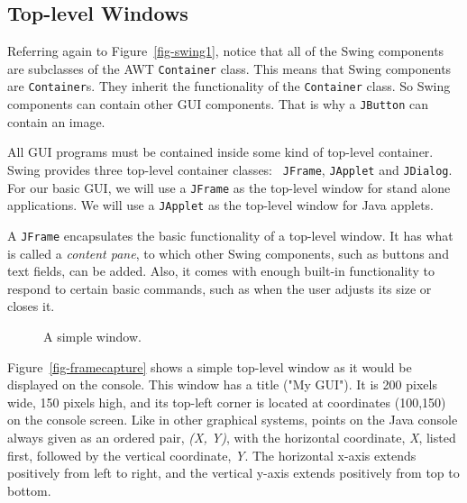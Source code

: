 \subsection{Top-level Windows}

Referring again to Figure~\ref{fig-swing1}, notice that all of the
Swing components are subclasses of the AWT {\tt Container} class.
This means that Swing components are {\tt Container}s. They inherit
the functionality of the {\tt Container} class. So Swing components
can contain other GUI components. That is why a {\tt JButton} can
contain an image.

All GUI programs must be contained inside some kind of top-level
container.  Swing provides three top-level container classes: {\tt
JFrame}, {\tt JApplet} and {\tt JDialog}.  For our basic GUI, we will
use a {\tt JFrame} as the top-level window for stand alone
applications.  We will use a {\tt JApplet} as the top-level window for
Java applets.

A {\tt JFrame} encapsulates the basic functionality of a top-level
window. It has what is called a {\em content pane}, to which
other Swing components, such as buttons and text fields, can be
added. Also, it comes with enough built-in functionality to respond to
certain basic commands, such as when the user adjusts its
size or closes it.

\begin{figure}[tb]
{A simple window.
\label{fig-framecapture}
\label{pg-fig-framecapture}}
\end{figure}

Figure~\ref{fig-framecapture} shows a simple top-level window as it
would be displayed on the console. This window has a title ("My
GUI"). It is 200 pixels wide, 150 pixels high, and its top-left corner
is located at coordinates (100,150) on the console screen.  Like in
other graphical systems, points on the Java console always given as an
ordered pair, {\it (X, Y)}, with the horizontal coordinate, {\it X},
listed first, followed by the vertical coordinate, {\it Y}.  
The horizontal x-axis extends positively from left to right,
and the vertical y-axis extends positively from top to bottom.

